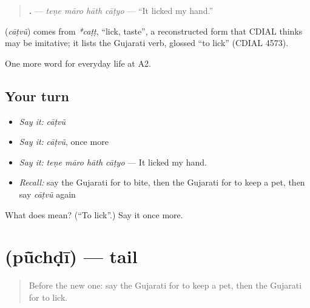\begin{quote}
\textbf{   .} — \emph{teṇe māro hāth cāṭyo} — \textquotedblleft{}It licked my hand.\textquotedblright{}
\end{quote}

\begin{cousinweb}
\textbf{} (\emph{cāṭvũ}) comes from \emph{*caṭṭ}, \textquotedblleft{}lick, taste\textquotedblright{}, a reconstructed form that CDIAL thinks may be imitative; it lists the Gujarati verb, glossed \textquotedblleft{}to lick\textquotedblright{} (CDIAL 4573).
\end{cousinweb}

\begin{grammarlens}[title={What you've built}]
One more word for everyday life at A2.
\end{grammarlens}

\subsection*{Your turn}
\begin{itemize}
\raggedright
  \item \emph{Say it:} \emph{cāṭvũ}
  \item \emph{Say it:} \emph{cāṭvũ}, once more
  \item \emph{Say it:} \emph{teṇe māro hāth cāṭyo} — It licked my hand.
  \item \emph{Recall:} say the Gujarati for to bite, then the Gujarati for to keep a pet, then say \emph{cāṭvũ} again
\end{itemize}

\begin{tcolorbox}[breakable,colback=teal!4,colframe=teal!35!black,title={Before you move on}]
What does  mean? (\textquotedblleft{}To lick\textquotedblright{}.) Say it once more.
\end{tcolorbox}
\section[\texorpdfstring{\gu{પૂંછડી} (pū̃chḍī)}{પૂંછડી (pū̃chḍī)}]{ (pū̃chḍī) — tail}

\label{lesson:GU-C235-puchdi}



\begin{quote}
Before the new one: say the Gujarati for to keep a pet, then the Gujarati for to lick.
\end{quote}

